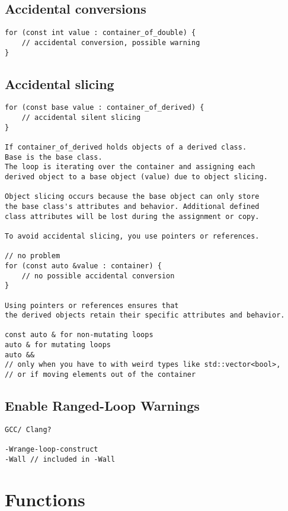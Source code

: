 \subsection{Accidental conversions}

\begin{verbatim}
for (const int value : container_of_double) {
    // accidental conversion, possible warning
}
\end{verbatim}

\subsection{Accidental slicing}

\begin{verbatim}
for (const base value : container_of_derived) {
    // accidental silent slicing
}

If container_of_derived holds objects of a derived class. 
Base is the base class.
The loop is iterating over the container and assigning each
derived object to a base object (value) due to object slicing.

Object slicing occurs because the base object can only store
the base class's attributes and behavior. Additional defined 
class attributes will be lost during the assignment or copy.

To avoid accidental slicing, you use pointers or references.

// no problem
for (const auto &value : container) {
    // no possible accidental conversion
}

Using pointers or references ensures that 
the derived objects retain their specific attributes and behavior.

const auto & for non-mutating loops
auto & for mutating loops
auto && 
// only when you have to with weird types like std::vector<bool>,
// or if moving elements out of the container
\end{verbatim}

\subsection{Enable Ranged-Loop Warnings}

\begin{verbatim}
GCC/ Clang?

-Wrange-loop-construct
-Wall // included in -Wall
\end{verbatim}

\section{Functions}

